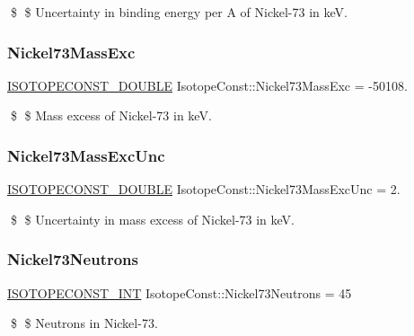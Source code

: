 \$ \$ Uncertainty in binding energy per A of Nickel-\/73 in keV. \mbox{\label{group___isotope_const-_nickel-_ni73_ga268e8a0bdbadd8c88c95c7760cf3ac4e}} 
\subsubsection{\texorpdfstring{Nickel73\+Mass\+Exc}{Nickel73MassExc}}
{\footnotesize\ttfamily \mbox{\hyperlink{group___isotope_const-_macros_ga8f45a7272ce02c0b4c65c44636ed719a}{I\+S\+O\+T\+O\+P\+E\+C\+O\+N\+S\+T\+\_\+\+D\+O\+U\+B\+LE}} Isotope\+Const\+::\+Nickel73\+Mass\+Exc = -\/50108.}

\$ \$ Mass excess of Nickel-\/73 in keV. \mbox{\label{group___isotope_const-_nickel-_ni73_gab6a292fe4ba7d22ddb1cf37ff64a3186}} 
\subsubsection{\texorpdfstring{Nickel73\+Mass\+Exc\+Unc}{Nickel73MassExcUnc}}
{\footnotesize\ttfamily \mbox{\hyperlink{group___isotope_const-_macros_ga8f45a7272ce02c0b4c65c44636ed719a}{I\+S\+O\+T\+O\+P\+E\+C\+O\+N\+S\+T\+\_\+\+D\+O\+U\+B\+LE}} Isotope\+Const\+::\+Nickel73\+Mass\+Exc\+Unc = 2.}

\$ \$ Uncertainty in mass excess of Nickel-\/73 in keV. \mbox{\label{group___isotope_const-_nickel-_ni73_ga75bc43f6dbcbb6db7f0f9e1d45ab63c7}} 
\subsubsection{\texorpdfstring{Nickel73\+Neutrons}{Nickel73Neutrons}}
{\footnotesize\ttfamily \mbox{\hyperlink{group___isotope_const-_macros_ga5f18360b3e99483a35c32d789e62621c}{I\+S\+O\+T\+O\+P\+E\+C\+O\+N\+S\+T\+\_\+\+I\+NT}} Isotope\+Const\+::\+Nickel73\+Neutrons = 45}

\$ \$ Neutrons in Nickel-\/73. \mbox{\label{group___isotope_const-_nickel-_ni73_gac76f119b03f165e1c965c574359400ac}} 
